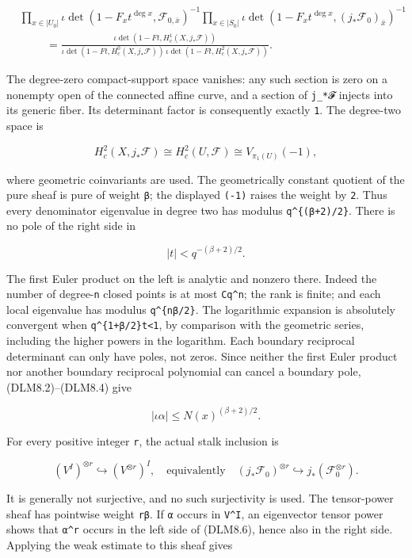 \documentclass[
]{report}
\newcounter{none} %
\begin{document}
\[
\begin{aligned}
&\prod_{x\in|U_0|}\iota\det(1-F_xt^{\deg x},\mathcal F_{0,\bar x})^{-1}
\prod_{x\in|S_0|}\iota\det(1-F_xt^{\deg x},(j_*\mathcal F_0)_{\bar x})^{-1}\\
&\hspace{1cm}=
\frac{\iota\det(1-Ft,H_c^1(X,j_*\mathcal F))}
{\iota\det(1-Ft,H_c^0(X,j_*\mathcal F))\,
 \iota\det(1-Ft,H_c^2(X,j_*\mathcal F))}.
\end{aligned}
\tag{DLM8.2}
\]

The degree-zero compact-support space vanishes: any such section is zero
on a nonempty open of the connected affine curve, and a section of
\texttt{j\_*𝓕} injects into its generic fiber. Its determinant factor is
consequently exactly \texttt{1}. The degree-two space is

\[
H_c^2(X,j_*\mathcal F)
\cong H_c^2(U,\mathcal F)
\cong V_{\pi_1(U)}(-1),
\tag{DLM8.3}
\]

where geometric coinvariants are used. The geometrically constant
quotient of the pure sheaf is pure of weight \texttt{β}; the displayed
\texttt{(-1)} raises the weight by \texttt{2}. Thus every denominator
eigenvalue in degree two has modulus \texttt{q\^{}\{(β+2)/2\}}. There is
no pole of the right side in

\[
|t|<q^{-(\beta+2)/2}.
\tag{DLM8.4}
\]

The first Euler product on the left is analytic and nonzero there.
Indeed the number of degree-\texttt{n} closed points is at most
\texttt{Cq\^{}n}; the rank is finite; and each local eigenvalue has
modulus \texttt{q\^{}\{nβ/2\}}. The logarithmic expansion is absolutely
convergent when
\texttt{q\^{}\{1+β/2\}\textbar{}t\textbar{}\textless{}1}, by comparison
with the geometric series, including the higher powers in the logarithm.
Each boundary reciprocal determinant can only have poles, not zeros.
Since neither the first Euler product nor another boundary reciprocal
polynomial can cancel a boundary pole, (DLM8.2)--(DLM8.4) give

\[
|\iota\alpha|\le N(x)^{(\beta+2)/2}.
\tag{DLM8.5}
\]

For every positive integer \texttt{r}, the actual stalk inclusion is

\[
(V^I)^{\otimes r}\hookrightarrow (V^{\otimes r})^I,
\quad\text{equivalently}\quad
(j_*\mathcal F_0)^{\otimes r}\hookrightarrow j_*(\mathcal F_0^{\otimes r}).
\tag{DLM8.6}
\]

It is generally not surjective, and no such surjectivity is used. The
tensor-power sheaf has pointwise weight \texttt{rβ}. If \texttt{α}
occurs in \texttt{V\^{}I}, an eigenvector tensor power shows that
\texttt{α\^{}r} occurs in the left side of (DLM8.6), hence also in the
right side. Applying the weak estimate to this sheaf gives
\end{document}
